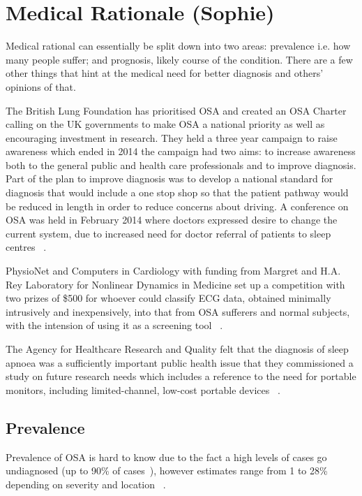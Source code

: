 \section{Medical Rationale (Sophie)}
\label{sec:medicalneed-sophie}
Medical rational can essentially be split down into two areas: prevalence i.e. how many people suffer; and prognosis, likely course of the condition. There are a few other things that hint at the medical need for better diagnosis and others’ opinions of that. 

The British Lung Foundation has prioritised OSA and created an OSA Charter calling on the UK governments to make OSA a national priority as well as encouraging investment in research. They held a three year campaign to raise awareness which ended in 2014 the campaign had two aims: to increase awareness both to the general public and health care professionals and to improve diagnosis. Part of the plan to improve diagnosis was to develop a national standard for diagnosis that would include a one stop shop so that the patient pathway would be reduced in length in order to reduce concerns about driving. A conference on OSA was held in February 2014 where doctors expressed desire to change the current system, due to increased need for doctor referral of patients to sleep centres ~\cite{britishlungfoundation}.

PhysioNet and Computers in Cardiology with funding from Margret and H.A. Rey Laboratory for Nonlinear Dynamics in Medicine set up a competition with two prizes of \$500 for whoever could classify ECG data, obtained minimally intrusively and inexpensively, into that from OSA sufferers and normal subjects, with the intension of using it as a screening tool ~\cite{physionet}.

The Agency for Healthcare Research and Quality felt that the diagnosis of sleep apnoea was a sufficiently important public health issue that they commissioned a study on future research needs which includes a reference to the need for portable monitors, including limited-channel, low-cost portable devices ~\cite{balk2012future}.

\subsection{Prevalence}
Prevalence of OSA is hard to know due to the fact a high levels of cases go undiagnosed (up to 90\% of cases~\cite{finkel2009prevalence}), however estimates range from 1 to 28\% depending on severity and location ~\cite{young2002epidemiology}.

